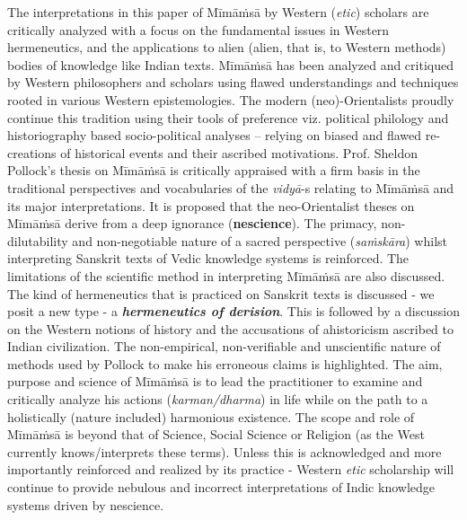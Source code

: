 The interpretations in this paper of Mīmāṁsā by Western (\textit{etic}) scholars are critically analyzed with a focus on the fundamental issues in Western hermeneutics, and the applications to alien (alien, that is, to Western methods) bodies of knowledge like Indian texts. Mīmāṁsā has been analyzed and critiqued by Western philosophers and scholars using flawed understandings and techniques rooted in various Western epistemologies. The modern (neo)-Orientalists proudly continue this tradition using their tools of preference viz. political philology and historiography based socio-political analyses – relying on biased and flawed re-creations of historical events and their ascribed motivations. Prof. Sheldon Pollock's thesis on Mīmāṁsā is critically appraised with a firm basis in the traditional perspectives and vocabularies of the \textit{vidyā}-s relating to Mīmāṁsā and its major interpretations. It is proposed that the neo-Orientalist theses on Mīmāṁsā derive from a deep ignorance (\textbf{nescience}). The primacy, non-dilutability and non-negotiable nature of a sacred perspective (\textit{saṁskāra}) whilst interpreting Sanskrit texts of Vedic knowledge systems is reinforced. The limitations of the scientific method in interpreting Mīmāṁsā are also discussed. The kind of hermeneutics that is practiced on Sanskrit texts is discussed - we posit a new type - a \textbf{\textit{hermeneutics of derision}}. This is followed by a discussion on the Western notions of history and the accusations of ahistoricism ascribed to Indian civilization. The non-empirical, non-verifiable and unscientific nature of methods used by Pollock to make his erroneous claims is highlighted. The aim, purpose and science of Mīmāṁsā is to lead the practitioner to examine and critically analyze his actions (\textit{karman/dharma}) in life while on the path to a holistically (nature included) harmonious existence. The scope and role of Mīmāṁsā is beyond that of Science, Social Science or Religion (as the West currently knows/interprets these terms). Unless this is acknowledged and more importantly reinforced and realized by its practice - Western \textit{etic} scholarship will continue to provide nebulous and incorrect interpretations of Indic knowledge systems driven by nescience.

